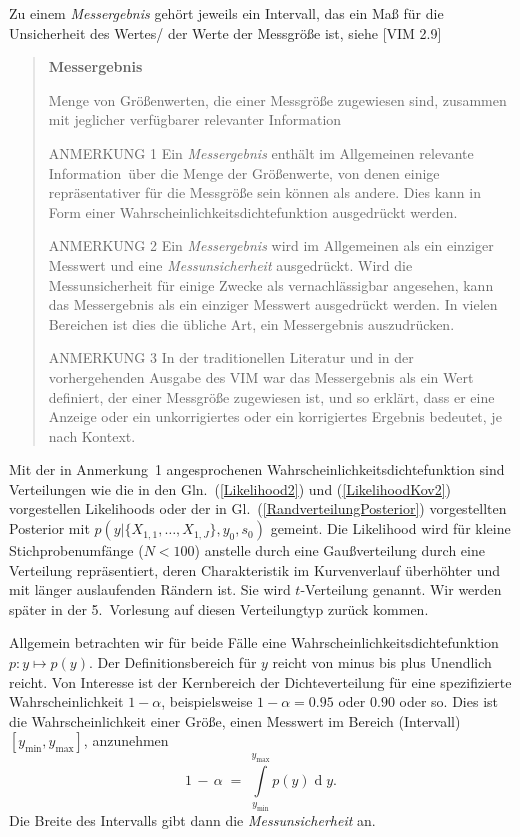 Zu einem \textsl{Messergebnis} gehört jeweils ein Intervall, das ein Maß für die Unsicherheit
des Wertes/ der Werte der Messgröße ist, siehe [VIM 2.9]

\begin{quote}
\textbf{Messergebnis}

Menge von Größenwerten, die einer Messgröße zugewiesen sind, zusammen mit jeglicher
verfügbarer relevanter Information

ANMERKUNG 1 Ein \textsl{Messergebnis} enthält im Allgemeinen \glqq relevante Information\grqq ~über
die Menge der Größenwerte, von denen einige repräsentativer für die Messgröße sein können als andere.
Dies kann in Form einer Wahrscheinlichkeitsdichtefunktion ausgedrückt werden.

ANMERKUNG 2 Ein \textsl{Messergebnis} wird im Allgemeinen
als ein einziger Messwert und eine \textsl{Messunsicherheit}
ausgedrückt. Wird die Messunsicherheit für einige
Zwecke als vernachlässigbar angesehen, kann das
Messergebnis als ein einziger Messwert ausgedrückt
werden. In vielen Bereichen ist dies die übliche Art, ein
Messergebnis auszudrücken.

ANMERKUNG 3 In der traditionellen Literatur und in der
vorhergehenden Ausgabe des VIM war das Messergebnis
als ein Wert definiert, der einer Messgröße zugewiesen
ist, und so erklärt, dass er eine Anzeige oder ein
unkorrigiertes oder ein korrigiertes Ergebnis bedeutet, je
nach Kontext.
\end{quote}

Mit der in Anmerkung~1 angesprochenen Wahrscheinlichkeitsdichtefunktion sind Verteilungen wie
die in den Gln.~(\ref{Likelihood2}) und (\ref{LikelihoodKov2}) vorgestellen Likelihoods oder
der in Gl.~(\ref{RandverteilungPosterior}) vorgestellten Posterior
mit $p(y | \{X_{1,1}, \dots, X_{1,J}\}, y_0, s_0)$ gemeint. Die Likelihood wird
für kleine Stich\-proben\-um\-fänge ($N < 100$) anstelle durch eine Gaußverteilung durch eine Verteilung 
repräsentiert, deren Charakteristik im Kurvenverlauf
überhöhter und mit länger auslaufenden Rändern ist. Sie wird $t$-Verteilung genannt.
Wir werden später in der 5.\ Vorlesung auf diesen Verteilungtyp zurück kommen.

Allgemein betrachten wir für beide Fälle eine Wahrscheinlichkeitsdichtefunktion $p \! : y \mapsto p(y)$.
Der Definitionsbereich für $y$ reicht von minus bis plus Unendlich reicht. Von Interesse ist der Kernbereich
der Dichteverteilung für eine spezifizierte Wahrscheinlichkeit $1-\alpha$, beispielsweise
$1-\alpha = 0.95$ oder $0.90$ oder so.
Dies ist die Wahrscheinlichkeit einer Größe, einen Messwert im Bereich (Intervall) $[y_\mathrm{min}, y_\mathrm{max}]$,
anzunehmen
\begin{equation}
1 \, - \, \alpha \; = \; 
\int\limits_{y_\mathrm{min}}^{y_\mathrm{max}} p(y) 
\operatorname{d}y .
\label{UeberdeckungWahrscheinlichkeit}
\end{equation}
Die Breite des Intervalls gibt dann die \textsl{Messunsicherheit} an.

